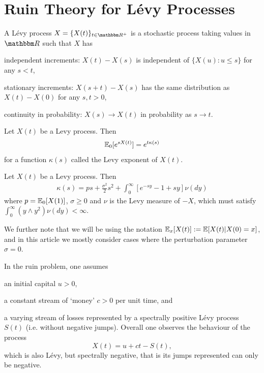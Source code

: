 \section{Ruin Theory for L\'evy Processes}
\begin{defn}
A L\'evy process $X = \{ X(t) \}_{t \in \R^+ }$ is a stochastic process taking values in $\R$ such that $X$ has
\enumb
\item independent increments: $X(t)-X(s)$ is independent of $\{ X(u) : u \leq s \}$ for any ${s<t}$,
\item stationary increments: $X(s+t)-X(s)$ has the same distribution as $X(t)-X(0)$ for any ${s,t>0}$,
\item continuity in probability: $ X(s) \rightarrow X(t) $ in probability as $s \rightarrow t$.
\enume
\end{defn}

\begin{rmk}
Let $X(t)$ be a Levy process. Then
\begin{align*}
\mathbb{E}_0 [e^{sX(t)}] = e^{t\kappa(s)}
\label{LevyExp}
\end{align*}
for a function $\kappa(s)$ called the Levy exponent of $X(t)$.
\end{rmk}
\begin{rmk}
Let $X(t)$ be a Levy process. Then
\begin{align*}
\kappa(s) = ps + \frac{\sigma^2}{2} s^2 + \int_0^{\infty} [e^{-sy}-1 +sy ] \nu(dy)
\end{align*}
where $p=\mathbb{E}_0[X(1)]$, $\sigma \geq 0$ and $\nu$ is the Levy measure of $-X$, which must satisfy
 $ \int_{0}^{\infty} (y\wedge y^2) \nu(dy) < \infty$.
\end{rmk}
We further note that we will be using the notation $\mathbb{E}_x [X(t)] := \mathbb{E} [X(t) | X(0)=x]$, and in this article we mostly consider cases where the perturbation parameter $\sigma=0$.

In the ruin problem, one assumes
\enumb
\item an initial capital $u>0$,
\item a constant stream of `money' $c>0$ per unit time, and
\item a varying stream of losses represented by a spectrally positive L\'evy process $S(t)$ (i.e. without negative jumps).
\enume
Overall  one observes the behaviour of the process
\[ X(t) = u + ct - S(t), \]
which is also L\'evy, but spectrally negative, that is its jumps represented  can only be negative.

